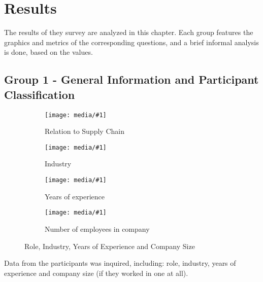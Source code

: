 
\section{Results}



The results of they survey are analyzed in this chapter. Each group features the graphics and metrics of the corresponding questions, and a brief informal analysis is done, based on the values.

\subsection{Group 1 - General Information and Participant Classification}

\newcommand{\resfig}[2]{
    \begin{subfigure}{.55\textwidth}
        \centering
        \texttt{[image: media/\#1]}
        \caption{#2}
    \end{subfigure}
}

\begin{figure}[ht]

    \resfig{sc_role}{Relation to Supply Chain}
    \resfig{sc_industry}{Industry}

    \resfig{sc_experience}{Years of experience}
    \resfig{nr_employees}{Number of employees in company}

      \caption{Role, Industry, Years of Experience and Company Size}
    \label{fig:group1_graphics}
\end{figure}


Data from the participants was inquired, including: role, industry, years of experience and company size (if  they worked in one at all).


